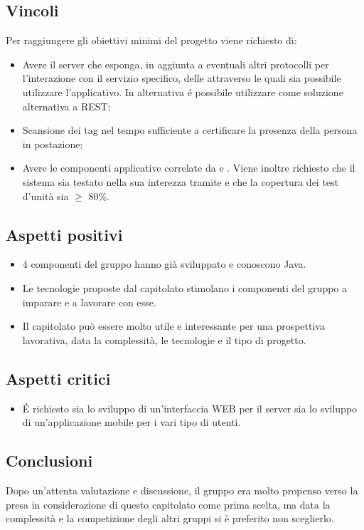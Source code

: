 \subsection{Vincoli}
Per raggiungere gli obiettivi minimi del progetto viene richiesto di:
\begin{itemize}
\item Avere il server che esponga, in aggiunta a eventuali altri protocolli per l’interazione con il servizio specifico, delle   attraverso le quali sia possibile utilizzare l'applicativo. In alternativa \'e possibile utilizzare  come soluzione alternativa a REST;
\item Scansione dei tag nel tempo sufficiente a certificare la presenza della persona in postazione;
\item Avere le componenti applicative correlate da  e . Viene inoltre richiesto che il sistema sia testato nella sua interezza tramite  e che la copertura dei test d'unità sia $\geq$ 80\%.
\end{itemize}

\subsection{Aspetti positivi}
\begin{itemize} 
	\item 4 componenti del gruppo hanno già sviluppato e conoscono Java.
	\item Le tecnologie proposte dal capitolato stimolano i componenti del gruppo a imparare e a lavorare con esse.
	\item Il capitolato può essere molto utile e interessante per una prospettiva lavorativa, data la complessità, le tecnologie e il tipo di progetto.
\end{itemize}

\subsection{Aspetti critici}
\begin{itemize}
\item \'E richiesto sia lo sviluppo di un'interfaccia WEB per il server sia lo sviluppo di un'applicazione mobile per i vari tipo di utenti.
\end{itemize}

\subsection{Conclusioni}
Dopo un'attenta valutazione e discussione, il gruppo era molto propenso verso la presa in considerazione di questo capitolato come prima scelta, ma data la complessità e la competizione degli altri gruppi si è preferito non sceglierlo.
